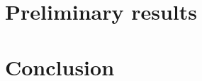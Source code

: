 \documentclass[conference]{IEEEtran} %
\begin{document}






\section{Preliminary results}



\section{Conclusion}
\label{sec:conclusion}





\end{document}
